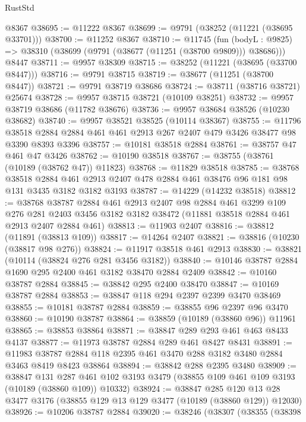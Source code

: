 \begin{lexlean}{RustStd}
\begin{coremodule}
    @8367
@38695 := @11222 @8367
@38699 := @9791 (@38252 (@11221 (@38695 @33701)))
@38700 := @11252 @8367
@38710 := @11745
    (fun (bodyL : @9825) => @38310 (@38699 (@9791 (@38677 (@11251 (@38700 @9809))) @38686)))
    @8447
@38711 := @9957 @38309
@38715 := @38252 (@11221 (@38695 (@33700 @8447)))
@38716 := @9791 @38715
@38719 := @38677 (@11251 (@38700 @8447))
@38721 := @9791 @38719 @38686
@38724 := @38711 (@38716 @38721) @25674
@38728 := @9957 @38715 @38721 (@10109 @38251)
@38732 := @9957 @38719 @38686 (@11782 @38676)
@38736 := @9957 @38684 @38526 (@10230 @38682)
@38740 := @9957 @38521 @38525 (@10114 @38367)
@38755 := @11796
    @38518
    @2884
    @2884
    @461
    @461
    @2913
    @267
    @2407
    @479
    @3426
    @38477
    @98
    @3390
    @8393
    @3396
@38757 := @10181 @38518 @2884
@38761 := @38757 @47 @461 @47 @3426
@38762 := @10190 @38518
@38767 := @38755 (@38761 (@10189 (@38762 @47)) @11823)
@38768 := @11829 @38518
@38785 := @38768
    @38518
    @2884
    @461
    @2913
    @2407
    @478
    @2884
    @461
    @38476
    @96
    @181
    @98
    @131
    @3435
    @3182
    @3182
    @3193
@38787 := @14229 (@14232 @38518)
@38812 := @38768
    @38787
    @2884
    @461
    @2913
    @2407
    @98
    @2884
    @461
    @3299
    @109
    @276
    @281
    @2403
    @3456
    @3182
    @3182
    @38472
    (@11881 @38518 @2884 @461 @2913 @2407 @2884 @461)
@38813 := @11903 @2407
@38816 := @38812 (@11891 (@38813 @109))
@38817 := @14264 @2407
@38821 := @38816 (@10230 (@38817 @98 @276))
@38824 := @11917 @38518 @461 @2913
@38830 := @38821 (@10114 (@38824 @276 @281 @3456 @3182))
@38840 := @10146 @38787 @2884 @1690 @295 @2400 @461 @3182 @38470 @2884 @2409
@38842 := @10160 @38787 @2884
@38845 := @38842 @295 @2400 @38470
@38847 := @10169 @38787 @2884
@38853 := @38847 @118 @294 @2397 @2399 @3470 @38469
@38855 := @10181 @38787 @2884
@38859 := @38855 @96 @2397 @96 @3470
@38860 := @10190 @38787
@38864 := @38859 (@10189 (@38860 @96)) @11961
@38865 := @38853 @38864
@38871 := @38847 @289 @293 @461 @463 @8433 @4137
@38877 := @11973 @38787 @2884 @289 @461 @8427 @8431
@38891 := @11983 @38787 @2884 @118 @2395 @461 @3470 @288 @3182 @3480 @2884 @3463 @8419 @8423 @38864
@38894 := @38842 @288 @2395 @3480
@38909 := @38847
    @131
    @287
    @461
    @102
    @3193
    @3479
    (@38855 @109 @461 @109 @3193 (@10189 (@38860 @109)) @10332)
@38924 := @38847
    @285
    @120
    @13
    @28
    @3477
    @3176
    (@38855 @129 @13 @129 @3477 (@10189 (@38860 @129)) @12030)
@38926 := @10206 @38787 @2884
@39020 := @38246
    (@38307
      (@38355
        (@38398

\end{coremodule}
\end{lexlean}
